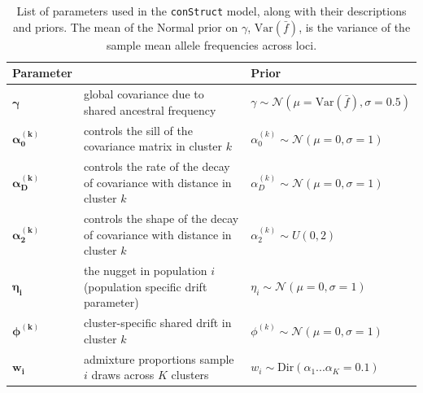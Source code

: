 \documentclass[12pt]{article}
\begin{document}
\begin{centering}
\begin{table}
\begin{tabular}{| >{\centering\arraybackslash}m{2.1cm} | m{5.2cm} | >{\centering\arraybackslash}m{5.1cm} |}
	\hline
	\textbf{Parameter} & \centering{\textbf{Description}} & \textbf{Prior}\\ \hline
	$\boldsymbol{\gamma}$ & 
		global covariance due to shared ancestral frequency & 
		$\gamma \sim \mathcal{N}(\mu = \text{Var}(\bar{f}), \sigma = 0.5)$\\ \hline
	$\boldsymbol{\alpha^{(k)}_0}$ & 
		controls the sill of the covariance matrix in cluster $k$& 
		$\alpha^{(k)}_0 \sim \mathcal{N}(\mu = 0, \sigma = 1)$\\ \hline
	$\boldsymbol{\alpha^{(k)}_D}$ & 
		controls the rate of the decay of covariance with distance in cluster $k$& 
		$\alpha^{(k)}_D \sim \mathcal{N}(\mu = 0, \sigma = 1)$\\ \hline
	$\boldsymbol{\alpha^{(k)}_2}$ & 
		controls the shape of the decay of covariance with distance in cluster $k$ & 
		$\alpha^{(k)}_2 \sim U(0,2)$\\ \hline
	$\boldsymbol{\eta_i}$ & 
		the nugget in population $i$ (population specific drift parameter)  & 
		$\eta_i \sim \mathcal{N}(\mu = 0, \sigma = 1)$\\ \hline
	$\boldsymbol{\phi^{(k)}}$ & 
		cluster-specific shared drift in cluster $k$ &
		 $\phi^{(k)} \sim \mathcal{N}(\mu = 0, \sigma = 1)$\\ \hline
	$\boldsymbol{w_i}$ &
		admixture proportions sample $i$ draws across $K$ clusters &
		$w_i \sim \text{Dir}(\alpha_{1} ... \alpha_{K}=0.1)$  \\ \hline
	\hline
\end{tabular}
\caption{
List of parameters used in the \texttt{conStruct} model, along with their descriptions and priors.
The mean of the Normal prior on $\gamma$, $\text{Var}(\bar{f})$, is the variance of the sample mean allele frequencies across loci.
}\label{tab:param_prior_tab}
\end{table}
\end{centering}

\newpage
\end{document}
